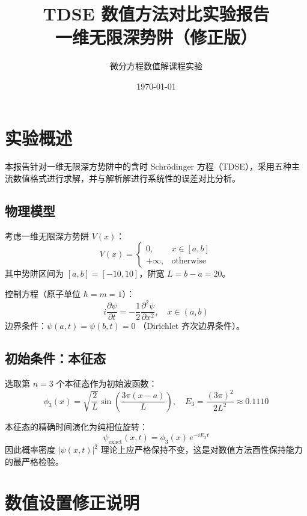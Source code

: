 \documentclass[12pt, a4paper]{article}
\title{\textbf{TDSE 数值方法对比实验报告} \\ \large 一维无限深势阱（修正版）}
\author{微分方程数值解课程实验}
\date{\today}
\begin{document}
\maketitle

\section{实验概述}

本报告针对一维无限深方势阱中的含时 Schr\"odinger 方程（TDSE），采用五种主流数值格式进行求解，并与解析解进行系统性的误差对比分析。

\subsection{物理模型}

考虑一维无限深方势阱 $V(x)$：
\[
V(x) =
\begin{cases}
0, & x \in [a, b] \\[4pt]
+\infty, & \text{otherwise}
\end{cases}
\]
其中势阱区间为 $[a, b] = [-10, 10]$，阱宽 $L = b - a = 20$。

控制方程（原子单位 $\hbar = m = 1$）：
\[
i\frac{\partial \psi}{\partial t} = -\frac{1}{2}\frac{\partial^2 \psi}{\partial x^2}, \quad x \in (a, b)
\]
边界条件：$\psi(a, t) = \psi(b, t) = 0$ （Dirichlet 齐次边界条件）。

\subsection{初始条件：本征态}

选取第 $n = 3$ 个本征态作为初始波函数：
\[
\phi_3(x) = \sqrt{\frac{2}{L}} \sin\!\left(\frac{3\pi (x - a)}{L}\right), \quad
E_3 = \frac{(3\pi)^2}{2 L^2} \approx 0.1110
\]

本征态的精确时间演化为纯相位旋转：
\[
\psi_{\text{exact}}(x, t) = \phi_3(x)\, e^{-i E_3 t}
\]
因此概率密度 $|\psi(x,t)|^2$ 理论上应严格保持不变，这是对数值方法酉性保持能力的最严格检验。

\section{数值设置修正说明}
\end{document}
